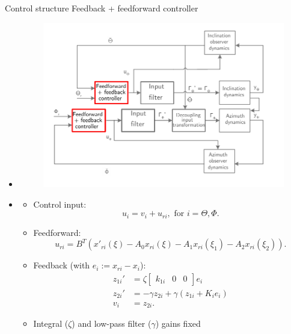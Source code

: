 \documentclass{beamer}
\begin{document}
\begin{frame}{Control structure}
Feedback + feedforward controller
\begin{itemize}
\item <1|only@1> []
\begin{figure}[ht]\centering
	\includegraphics[width=1\textwidth]{images/ControlStrategy3.pdf}
\end{figure}
\item <2|only@2> []
\begin{itemize}
				\item Control input:
				\begin{equation*}
				u_i = v_i + u_{ri}, \text{ for } i = \Theta,\Phi.
				\end{equation*}
				\item Feedforward:
				\begin{equation*}
				u_{ri} = B^T (x'_{ri}(\xi) - A_0 x_{ri}(\xi) - A_1 x_{ri}(\xi_1) - A_2 x_{ri}(\xi_2)).
				\end{equation*} 
				\item Feedback (with $e_i := x_{ri} - x_i$):
				\begin{align*}
				z_{1i}' &= \zeta \begin{bmatrix}
				k_{1i} & 0 & 0
				\end{bmatrix}e_i \\
				z_{2i}' &= -\gamma z_{2i} + \gamma (z_{1i} + K_i e_i)\\
				v_i &= z_{2i}.
				\end{align*}
				\item Integral ($\zeta$) and low-pass filter ($\gamma$) gains fixed
\end{itemize}
\end{itemize}
\end{frame}
\end{document}
